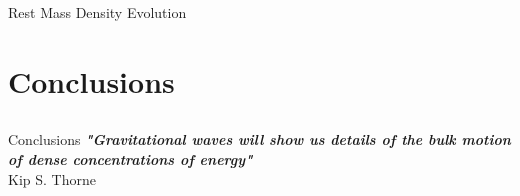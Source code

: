 \documentclass{beamer}
\theoremstyle{definition}
\theoremstyle{plain}
\begin{document}
\begin{frame}{Rest Mass Density Evolution}
\begin{figure}
    \centering
    \end{figure}
\end{frame}

\section{Conclusions}
\subsection{}
\begin{frame}{Conclusions}
\emph{\textbf{"Gravitational
waves will show us details of the bulk motion of
dense concentrations of energy"}}\\
\vspace{0.2cm} Kip S. Thorne
\begin{figure}
    \centering
    \end{figure}
\end{frame}
\end{document}
